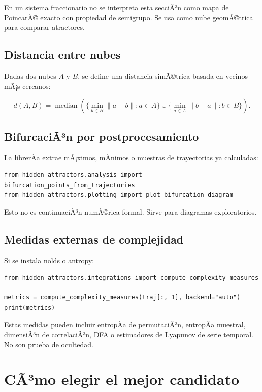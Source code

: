 \documentclass[11pt]{article}
\DeclareRobustCommand{\codepath}[1]{\begingroup\Urlmuskip=0mu plus 2mu\path{#1}\endgroup}
\def\codepath#1{#1}%
\begin{document}
En un sistema fraccionario no se interpreta esta secciÃ³n como mapa de PoincarÃ© exacto con propiedad de semigrupo. Se usa como nube geomÃ©trica para comparar atractores.

\subsection{Distancia entre nubes}

Dadas dos nubes \(A\) y \(B\), se define una distancia simÃ©trica basada en vecinos mÃ¡s cercanos:

\begin{equation}
d(A,B)=
\operatorname{median}
\left(
\{\min_{b\in B}\|a-b\|:a\in A\}
\cup
\{\min_{a\in A}\|b-a\|:b\in B\}
\right).
\end{equation}

\subsection{BifurcaciÃ³n por postprocesamiento}

La librerÃ­a extrae mÃ¡ximos, mÃ­nimos o muestras de trayectorias ya calculadas:

\begin{lstlisting}
from hidden_attractors.analysis import bifurcation_points_from_trajectories
from hidden_attractors.plotting import plot_bifurcation_diagram
\end{lstlisting}

Esto no es continuaciÃ³n numÃ©rica formal. Sirve para diagramas exploratorios.

\subsection{Medidas externas de complejidad}

Si se instala \codepath{nolds} o \codepath{antropy}:

\begin{lstlisting}
from hidden_attractors.integrations import compute_complexity_measures

metrics = compute_complexity_measures(traj[:, 1], backend="auto")
print(metrics)
\end{lstlisting}

Estas medidas pueden incluir entropÃ­a de permutaciÃ³n, entropÃ­a muestral, dimensiÃ³n de correlaciÃ³n, DFA o estimadores de Lyapunov de serie temporal. No son prueba de ocultedad.

\section{CÃ³mo elegir el mejor candidato}
\end{document}
